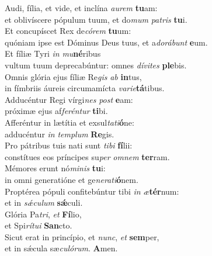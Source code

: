 \evenverse Audi, fília, et vide, et inclína \textit{au}\textit{rem} \textbf{tu}am:~\*\\
\evenverse et oblivíscere pópulum tuum, et do\textit{mum} \textit{pa}\textit{tris} \textbf{tu}i.\\
\oddverse Et concupíscet Rex de\textit{có}\textit{rem} \textbf{tu}um:~\*\\
\oddverse quóniam ipse est Dóminus Deus tuus, et a\textit{do}\textit{rá}\textit{bunt} \textbf{e}um.\\
\evenverse Et fíliæ Tyri \textit{in} \textit{mu}\textbf{né}ribus~\*\\
\evenverse vultum tuum deprecabúntur: omnes \textit{dí}\textit{vi}\textit{tes} \textbf{ple}bis.\\
\oddverse Omnis glória ejus fíliæ Re\textit{gis} \textit{ab} \textbf{in}tus,~\*\\
\oddverse in fímbriis áureis circumamícta \textit{va}\textit{ri}\textit{e}\textbf{tá}tibus.\\
\evenverse Adducéntur Regi vírgi\textit{nes} \textit{post} \textbf{e}am:~\*\\
\evenverse próximæ ejus af\textit{fe}\textit{rén}\textit{tur} \textbf{ti}bi.\\
\oddverse Afferéntur in lætítia et exsul\textit{ta}\textit{ti}\textbf{ó}ne:~\*\\
\oddverse adducéntur \textit{in} \textit{tem}\textit{plum} \textbf{Re}gis.\\
\evenverse Pro pátribus tuis nati sunt \textit{ti}\textit{bi} \textbf{fí}lii:~\*\\
\evenverse constítues eos príncipes su\textit{per} \textit{om}\textit{nem} \textbf{ter}ram.\\
\oddverse Mémores erunt nó\textit{mi}\textit{nis} \textbf{tu}i:~\*\\
\oddverse in omni generatióne et ge\textit{ne}\textit{ra}\textit{ti}\textbf{ó}nem.\\
\evenverse Proptérea pópuli confitebúntur tibi \textit{in} \textit{æ}\textbf{tér}num:~\*\\
\evenverse et in \textit{sǽ}\textit{cu}\textit{lum} \textbf{sǽ}culi.\\
\oddverse Glória Pa\textit{tri}, \textit{et} \textbf{Fí}lio,~\*\\
\oddverse et Spi\textit{rí}\textit{tu}\textit{i} \textbf{San}cto.\\
\evenverse Sicut erat in princípio, et \textit{nunc}, \textit{et} \textbf{sem}per,~\*\\
\evenverse et in sǽcula sæ\textit{cu}\textit{ló}\textit{rum}. \textbf{A}men.\\
